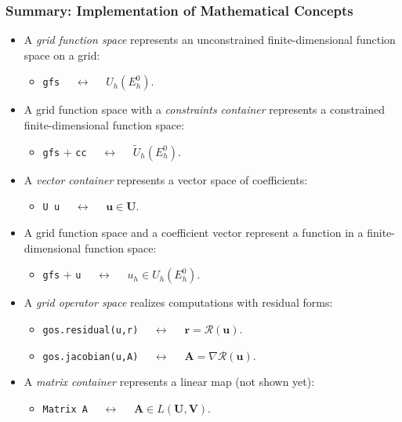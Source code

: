 \begin{frame}
\frametitle{Summary: Implementation of Mathematical Concepts}
\begin{itemize}
\item A \textit{grid function space} represents an unconstrained finite-dimensional
function space on a grid:
\begin{itemize}
\item \lstinline{gfs} $\quad\leftrightarrow\quad$ $U_h(E_h^0)$.
\end{itemize}
\item A grid function space with a \textit{constraints container} represents a constrained 
finite-dimensional function space:
\begin{itemize}
\item \lstinline{gfs} $+$ \lstinline{cc} $\quad\leftrightarrow\quad$ $\tilde{U}_h(E_h^0)$.
\end{itemize}
\item A \textit{vector container} represents a vector space of coefficients:
\begin{itemize}
\item \lstinline{U u} $\quad\leftrightarrow\quad$ $\mathbf{u}\in\mathbf{U}$.
\end{itemize}
\item A grid function space and a coefficient vector represent a function in a
finite-dimensional function space:
\begin{itemize}
\item \lstinline{gfs} $+$ \lstinline{u} $\quad\leftrightarrow\quad$ $u_h\in U_h(E_h^0)$.
\end{itemize}
\item A \textit{grid operator space} realizes computations with residual forms:
\begin{itemize}
\item \lstinline{gos.residual(u,r)} $\quad\leftrightarrow\quad$ $\mathbf{r} = \mathcal{R}(\mathbf{u})$.
\item \lstinline{gos.jacobian(u,A)} $\quad\leftrightarrow\quad$ $\mathbf{A} = \nabla\mathcal{R}(\mathbf{u})$.
\end{itemize}
\item A \textit{matrix container} represents a linear map (not shown yet):
\begin{itemize}
\item \lstinline{Matrix A} $\quad\leftrightarrow\quad$ $\mathbf{A}\in L(\mathbf{U},\mathbf{V})$.
\end{itemize}
\end{itemize}
\end{frame}

